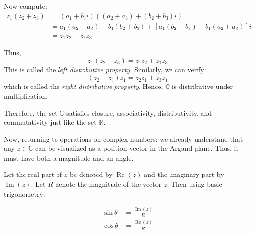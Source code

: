 Now compute:
\begin{align*}
z_1 (z_2 + z_3) &= (a_1 + b_1 i)((a_2 + a_3) + (b_2 + b_3)i) \\
&= a_1(a_2 + a_3) - b_1(b_2 + b_3) + [a_1(b_2 + b_3) + b_1(a_2 + a_3)]i \\
&= z_1 z_2 + z_1 z_3
\end{align*}

Thus,
\[
z_1(z_2 + z_3) = z_1 z_2 + z_1 z_3
\]
This is called the \emph{left distributive property}. Similarly, we can verify:
\[
(z_2 + z_3)z_1 = z_2 z_1 + z_3 z_1
\]
which is called the \emph{right distributive property}. Hence, $\mathbb{C}$ is distributive under multiplication.

Therefore, the set $\mathbb{C}$ satisfies closure, associativity, distributivity, and commutativity-just like the set $\mathbb{R}$.

Now, returning to operations on complex numbers: we already understand that any $z \in \mathbb{C}$ can be visualized as a position vector in the Argand plane. Thus, it must have both a magnitude and an angle.

\begin{center}
\end{center}

Let the real part of $z$ be denoted by $\operatorname{Re}(z)$ and the imaginary part by $\operatorname{Im}(z)$. Let $R$ denote the magnitude of the vector $z$. Then using basic trigonometry:

\begin{align}
\sin \theta &= \frac{\operatorname{Im}(z)}{R} \tag{1.1} \\
\cos \theta &= \frac{\operatorname{Re}(z)}{R} \tag{1.2}
\end{align}

